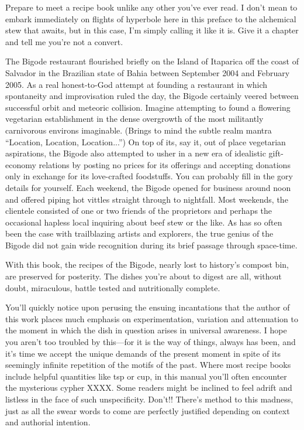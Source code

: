 
Prepare to meet a recipe book unlike any other you've ever read.  I
don't mean to embark immediately on flights of hyperbole here in this
preface to the alchemical stew that awaits, but in this case, I'm
simply calling it like it is.  Give it a chapter and tell me you're
not a convert.

The Bigode restaurant flourished briefly on the Island of Itaparica
off the coast of Salvador in the Brazilian state of Bahia between
September 2004 and February 2005.  As a real honest-to-God attempt at
founding a restaurant in which spontaneity and improvisation ruled the
day, the Bigode certainly veered between successful orbit and meteoric
collision.  Imagine attempting to found a flowering vegetarian
establishment in the dense overgrowth of the most militantly
carnivorous environs imaginable. (Brings to mind the subtle realm
mantra ``Location, Location, Location...'') On top of its, say it, out
of place vegetarian aspirations, the Bigode also attempted to usher in
a new era of idealistic gift-economy relations by posting no prices
for its offerings and accepting donations only in exchange for its
love-crafted foodstuffs.  You can probably fill in the gory details
for yourself.  Each weekend, the Bigode opened for business around
noon and offered piping hot vittles straight through to nightfall.
Most weekends, the clientele consisted of one or two friends of the
proprietors and perhaps the occasional hapless local inquiring about
beef stew or the like.  As has so often been the case with
trailblazing artists and explorers, the true genius of the Bigode did
not gain wide recognition during its brief passage through space-time.

With this book, the recipes of the Bigode, nearly lost to history's
compost bin, are preserved for posterity.  The dishes you're about to
digest are all, without doubt, miraculous, battle tested and
nutritionally complete.

You'll quickly notice upon perusing the ensuing incantations that the
author of this work places much emphasis on experimentation, variation
and attenuation to the moment in which the dish in question arises in
universal awareness.  I hope you aren't too troubled by this---for it
is the way of things, always has been, and it's time we accept the
unique demands of the present moment in spite of its seemingly
infinite repetition of the motifs of the past.  Where most recipe
books include helpful quantities like \onequarter tsp or \onehalf cup, in
this manual you'll often encounter the mysterious cypher XXXX.  Some
readers might be inclined to feel adrift and listless in the face of
such unspecificity.  Don't!!  There's method to this madness, just as
all the swear words to come are perfectly justified depending on
context and authorial intention.

